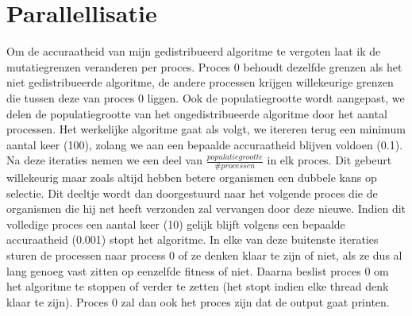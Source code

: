 \documentclass[a4paper]{article}
\begin{document}
\section{Parallellisatie}
Om de accuraatheid van mijn gedistribueerd algoritme te vergoten laat ik de mutatiegrenzen veranderen per proces. Proces 0 behoudt dezelfde grenzen als het niet gedistribueerde algoritme, de andere processen krijgen willekeurige grenzen die tussen deze van proces 0 liggen. Ook de populatiegrootte wordt aangepast, we delen de populatiegrootte van het ongedistribueerde algoritme door het aantal processen. Het werkelijke algoritme gaat als volgt, we itereren terug een minimum aantal keer (100), zolang we aan een bepaalde accuraatheid blijven voldoen (0.1). Na deze iteraties nemen we een deel van $\frac{populatiegrootte} {\#processen}$ in elk proces. Dit gebeurt willekeurig maar zoals altijd hebben betere organismen een dubbele kans op selectie. Dit deeltje wordt dan doorgestuurd naar het volgende proces die de organismen die hij net heeft verzonden zal vervangen door deze nieuwe. Indien dit volledige proces een aantal keer (10) gelijk blijft volgens een bepaalde accuraatheid (0.001) stopt het algoritme. In elke van deze buitenste iteraties sturen de processen naar process 0 of ze denken klaar te zijn of niet, als ze dus al lang genoeg vast zitten op eenzelfde fitness of niet. Daarna beslist proces 0 om het algoritme te stoppen of verder te zetten (het stopt indien elke thread denk klaar te zijn). Proces 0 zal dan ook het proces zijn dat de output gaat printen.
\end{document}
